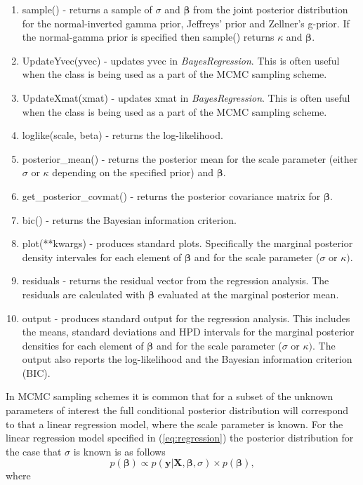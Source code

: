 \documentclass[article]{jss}
\begin{document}
\begin{enumerate}
\item sample() - returns a sample of $\sigma$ and $\bm{\beta}$ from
  the joint posterior distribution for the normal-inverted gamma
  prior, Jeffreys' prior and Zellner's g-prior. If the normal-gamma
  prior is specified then sample() returns $\kappa$ and $\bm{\beta}.$
\item UpdateYvec(yvec) - updates yvec in \emph{BayesRegression}. This
  is often useful when the class is being used as a part of the MCMC
  sampling scheme.
\item UpdateXmat(xmat) - updates xmat in \emph{BayesRegression}. This
  is often useful when the class is being used as a part of the MCMC
  sampling scheme.
\item loglike(scale, beta) - returns the log-likelihood.
\item posterior\_mean() - returns the posterior mean for the scale parameter
(either $\sigma$ or $\kappa$ depending on the specified prior) and
$\bm{\beta}.$
\item get\_posterior\_covmat() - returns the posterior covariance matrix
for $\bm{\beta}$.
\item bic() - returns the Bayesian information criterion.
\item plot({*}{*}kwargs) - produces standard plots. Specifically the
  marginal posterior density intervales for each element of
  $\bm{\beta}$ and for the scale parameter ($\sigma$ or $\kappa)$.
\item residuals - returns the residual vector from the regression
  analysis.  The residuals are calculated with $\bm{\beta}$ evaluated
  at the marginal posterior mean.
\item output - produces standard output for the regression analysis.
  This includes the means, standard deviations and HPD intervals for
  the marginal posterior densities for each element of $\bm{\beta}$
  and for the scale parameter ($\sigma$ or $\kappa)$. The output also
  reports the log-likelihood and the Bayesian information criterion
  (BIC).
\end{enumerate}
In MCMC sampling schemes it is common that for a subset of the unknown
parameters of interest the full conditional posterior distribution
will correspond to that a linear regression model, where the scale
parameter is known. For the linear regression model specified in
(\ref{eq:regression}) the posterior distribution for the case that
$\sigma$ is known is as follows\begin{equation} p(\bm{\beta})\propto
  p(\bm{y}|\bm{X},\bm{\beta},\sigma)\times
  p(\bm{\beta}),\label{eq:post_condbeta}\end{equation} where
\end{document}
